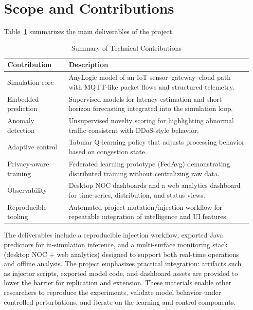 \section{Scope and Contributions}

Table~\ref{tab:contributions} summarizes the main deliverables of the project.

\begin{table}[H]
\centering
\caption{Summary of Technical Contributions}
\label{tab:contributions}
\begin{tabularx}{\textwidth}{@{}lX@{}}
\toprule
\textbf{Contribution} & \textbf{Description} \\
\midrule
Simulation core & AnyLogic model of an IoT sensor--gateway--cloud path with MQTT-like packet flows and structured telemetry. \\
Embedded prediction & Supervised models for latency estimation and short-horizon forecasting integrated into the simulation loop. \\
Anomaly detection & Unsupervised novelty scoring for highlighting abnormal traffic consistent with DDoS-style behavior. \\
Adaptive control & Tabular Q-learning policy that adjusts processing behavior based on congestion state. \\
Privacy-aware training & Federated learning prototype (FedAvg) demonstrating distributed training without centralizing raw data. \\
Observability & Desktop NOC dashboards and a web analytics dashboard for time-series, distribution, and status views. \\
Reproducible tooling & Automated project mutation/injection workflow for repeatable integration of intelligence and UI features. \\
\bottomrule
\end{tabularx}
\end{table}

The deliverables include a reproducible injection workflow, exported Java predictors for in-simulation inference, and a multi-surface monitoring stack (desktop NOC + web analytics) designed to support both real-time operations and offline analysis. The project emphasizes practical integration: artifacts such as injector scripts, exported model code, and dashboard assets are provided to lower the barrier for replication and extension. These materials enable other researchers to reproduce the experiments, validate model behavior under controlled perturbations, and iterate on the learning and control components.

